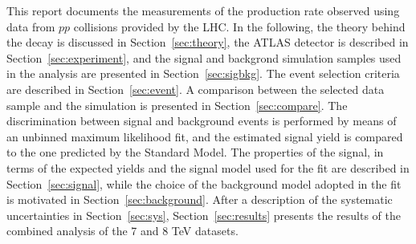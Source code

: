 This report documents the measurements of the \HToZg production rate observed
using data from $pp$ collisions provided by the LHC. In the following, the
theory behind the \HToZg decay is discussed in Section~\ref{sec:theory},
the ATLAS detector is described in Section~\ref{sec:experiment}, and the signal
and backgrond simulation samples used in the analysis are presented in
Section~\ref{sec:sigbkg}. The event selection criteria are described in 
Section~\ref{sec:event}. A comparison between the selected data sample and
the simulation is presented in Section~\ref{sec:compare}. The discrimination
between signal and background events is performed by means of an unbinned
maximum likelihood fit, and the estimated signal yield is compared to the one 
predicted by the Standard Model. The properties of the signal, in terms of
the expected yields and the signal model used for the fit are described
in Section~\ref{sec:signal}, while the choice of the background model adopted
in the fit is motivated in Section~\ref{sec:background}. After a description of
the systematic uncertainties in Section~\ref{sec:sys}, Section~\ref{sec:results}
presents the results of the combined analysis of the 7 and 8 TeV datasets.
